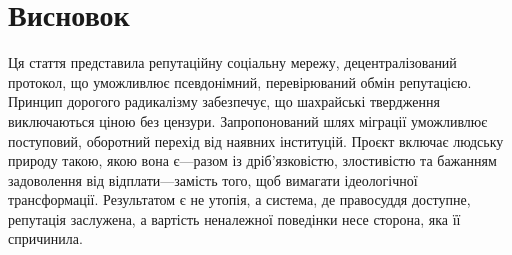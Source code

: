 \documentclass[11pt,a4paper,twocolumn]{article}
\begin{document}
\section{Висновок}

Ця стаття представила репутаційну соціальну мережу, децентралізований протокол, що уможливлює псевдонімний, перевірюваний обмін репутацією. Принцип дорогого радикалізму забезпечує, що шахрайські твердження виключаються ціною без цензури. Запропонований шлях міграції уможливлює поступовий, оборотний перехід від наявних інституцій. Проєкт включає людську природу такою, якою вона є---разом із дріб'язковістю, злостивістю та бажанням задоволення від відплати---замість того, щоб вимагати ідеологічної трансформації. Результатом є не утопія, а система, де правосуддя доступне, репутація заслужена, а вартість неналежної поведінки несе сторона, яка її спричинила.


\end{document}
